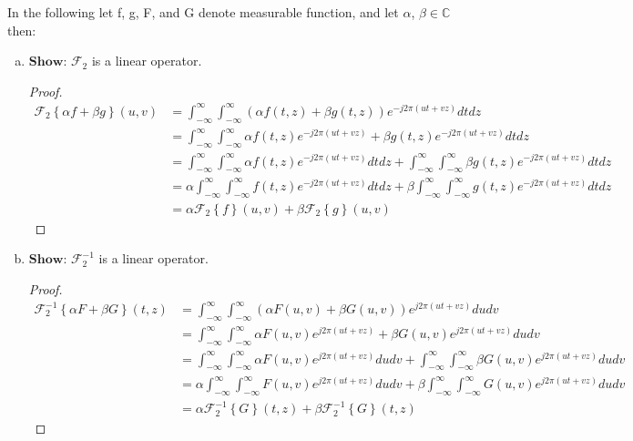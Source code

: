 \documentclass{paper}
\begin{document}
In the following let f, g, F, and G denote measurable function, and let $\alpha$, $\beta \in \mathbb{C}$ then:

\begin{enumerate}[(a)] 

\item $\textbf{Show}$: $\mathcal{F}_2$ is a linear operator. 
\begin{proof}
\begin{align*}
    \mathcal{F}_2 \left \{\alpha f + \beta g \right\}(u,v) 
    &= \int_{-\infty}^{\infty} \int_{-\infty}^{\infty} ( \alpha f(t,z) + \beta g(t,z) ) e^{-j 2 \pi (ut+vz)} dt dz \\
    &= \int_{-\infty}^{\infty} \int_{-\infty}^{\infty} \alpha f(t,z) e^{-j 2 \pi (ut+vz)} + \beta g(t,z) e^{-j 2 \pi (ut+vz)} dt dz \\
    &= \int_{-\infty}^{\infty} \int_{-\infty}^{\infty} \alpha f(t,z) e^{-j 2 \pi (ut+vz)} dt dz + \int_{-\infty}^{\infty} \int_{-\infty}^{\infty} \beta g(t,z) e^{-j 2 \pi (ut+vz)} dt dz \\
    &= \alpha \int_{-\infty}^{\infty} \int_{-\infty}^{\infty}  f(t,z) e^{-j 2 \pi (ut+vz)} dt dz + \beta \int_{-\infty}^{\infty} \int_{-\infty}^{\infty} g(t,z) e^{-j 2 \pi (ut+vz)} dt dz \\
    &= \alpha \mathcal{F}_2 \left \{f\right\}(u,v) + \beta \mathcal{F}_2 \left \{g \right\}(u,v)  
\end{align*}
\end{proof}

\item $\textbf{Show}$: $\mathcal{F}^{-1}_2$ is a linear operator. 
\begin{proof}
\begin{align*}
    \mathcal{F}^{-1}_2 \left \{\alpha F + \beta G \right\}(t,z) 
    &= \int_{-\infty}^{\infty} \int_{-\infty}^{\infty} ( \alpha F(u,v) + \beta G(u,v) ) e^{j 2 \pi (ut+vz)} du dv \\
    &= \int_{-\infty}^{\infty} \int_{-\infty}^{\infty} \alpha F(u,v) e^{j 2 \pi (ut+vz)} + \beta G(u,v) e^{j 2 \pi (ut+vz)} du dv \\
    &= \int_{-\infty}^{\infty} \int_{-\infty}^{\infty} \alpha F(u,v) e^{j 2 \pi (ut+vz)} du dv + \int_{-\infty}^{\infty} \int_{-\infty}^{\infty} \beta G(u,v) e^{j 2 \pi (ut+vz)} du dv \\
    &= \alpha \int_{-\infty}^{\infty} \int_{-\infty}^{\infty} F(u,v) e^{j 2 \pi (ut+vz)} du dv + \beta \int_{-\infty}^{\infty} \int_{-\infty}^{\infty} G(u,v) e^{j 2 \pi (ut+vz)} du dv \\
    &= \alpha \mathcal{F}^{-1}_2 \left \{G\right\}(t,z) + \beta \mathcal{F}^{-1}_2 \left \{G \right\}(t,z)  
\end{align*}
\end{proof}
\end{enumerate} 
\end{document}
